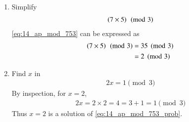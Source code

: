 \documentclass[journal,12pt,twocolumn]{IEEEtran}
\renewcommand\thesection{\arabic{section}}
\begin{document}
\begin{enumerate}[label=\thesection.\arabic*
,ref=\thesection.\theenumi]
\begin{enumerate}[label=\thesection.\arabic*
,ref=\thesection.\theenumi]
% 
\item Simplify 
\begin{align}
\label{eq:14_ap_mod_753}
\left(7\times 5\right)\pmod{3}
\end{align}
%
\solution \eqref{eq:14_ap_mod_753} can be expressed as
%
\begin{align}
\label{eq:14_ap_mod_753_sol}
\left(7\times 5\right)\pmod{3} &= 35\pmod{3} 
\nonumber \\
&=2\pmod{3}
\end{align}

\item Find $x$ in 
%
\begin{align}
\label{eq:14_ap_mod_753_prob}
2x =1\pmod{3}
\end{align}
%
%
\solution By inspection, for $x = 2$, 
\begin{align}
2x = 2\times 2 = 4 = 3+1 =1\pmod{3}
\end{align}
%
Thus $x = 2$ is a solution of \eqref{eq:14_ap_mod_753_prob}. 


\end{enumerate}
\end{enumerate}
\end{document}
